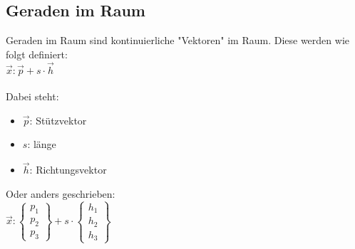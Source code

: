 \subsection{Geraden im Raum}
Geraden im Raum sind kontinuierliche "Vektoren" im Raum. 
Diese werden wie folgt definiert: \\
$
\vec{x}: \vec{p} + s\cdot \vec{h} 
$
\\ \\
Dabei steht:
\begin{itemize}
    \item $\vec{p}$: Stützvektor
    \item $s$: länge
    \item $\vec{h}$: Richtungsvektor
\end{itemize}
Oder anders geschrieben: \\
$
\vec{x}: 
\begin{Bmatrix}
    p_1 \\ p_2 \\ p_3
\end{Bmatrix}
+ s \cdot
\begin{Bmatrix}
    h_1 \\ h_2 \\ h_3
\end{Bmatrix}
$

